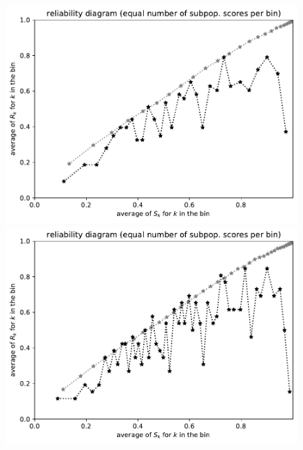 \documentclass{article}
\begin{document}
\begin{figure}
\begin{centering}
\parbox{\imsize}{\includegraphics[width=\imsize]
{./codes/unweighted/prob-1-60-night-snake-Hypsiglena-torquataequisamps30}}
\quad\quad
\parbox{\imsize}{\includegraphics[width=\imsize]
{./codes/unweighted/prob-1-60-night-snake-Hypsiglena-torquataequisamps50}}

\vspace{\vertsep}


\end{centering}
\end{figure}
\end{document}
